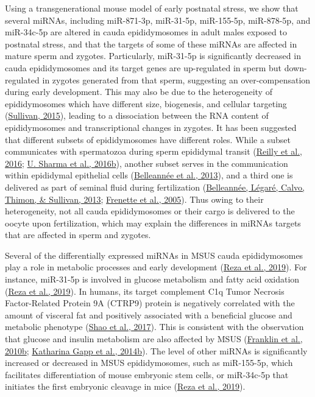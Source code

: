\documentclass[12pt,twoside]{reedthesis}
\begin{document}
Using a transgenerational mouse model of early postnatal stress, we show
that several miRNAs, including miR-871-3p, miR-31-5p, miR-155-5p,
miR-878-5p, and miR-34c-5p are altered in cauda epididymosomes in adult
males exposed to postnatal stress, and that the targets of some of these
miRNAs are affected in mature sperm and zygotes. Particularly, miR-31-5p
is significantly decreased in cauda epididymosomes and its target genes
are up-regulated in sperm but down-regulated in zygotes generated from
that sperm, suggesting an over-compensation during early development.
This may also be due to the heterogeneity of epididymosomes which have
different size, biogenesis, and cellular targeting (\protect\hyperlink{ref-sullivan_2015}{Sullivan, 2015}),
leading to a dissociation between the RNA content of epididymosomes and
transcriptional changes in zygotes. It has been suggested that different
subsets of epididymosomes have different roles. While a subset
communicates with spermatozoa during sperm epididymal transit
(\protect\hyperlink{ref-reilly_2016}{Reilly et al., 2016}; \protect\hyperlink{ref-sharma_2016}{U. Sharma et al., 2016b}), another subset serves in the communication
within epididymal epithelial cells (\protect\hyperlink{ref-belleanne_2013a}{Belleannée et al., 2013}), and a third one
is delivered as part of seminal fluid during fertilization
(\protect\hyperlink{ref-belleanne_2013}{Belleannée, Légaré, Calvo, Thimon, \& Sullivan, 2013}; \protect\hyperlink{ref-frenette_2005}{Frenette et al., 2005}). Thus owing to their heterogeneity,
not all cauda epididymosomes or their cargo is delivered to the oocyte
upon fertilization, which may explain the differences in miRNAs targets
that are affected in sperm and zygotes.

Several of the differentially expressed miRNAs in MSUS cauda
epididymosomes play a role in metabolic processes and early development
(\protect\hyperlink{ref-reza_2019}{Reza et al., 2019}). For instance, miR-31-5p is involved in glucose metabolism
and fatty acid oxidation (\protect\hyperlink{ref-reza_2019}{Reza et al., 2019}). In humans, its target complement
C1q Tumor Necrosis Factor-Related Protein 9A (CTRP9) protein is
negatively correlated with the amount of visceral fat and positively
associated with a beneficial glucose and metabolic phenotype
(\protect\hyperlink{ref-shao_2017}{Shao et al., 2017}). This is consistent with the observation that glucose and
insulin metabolism are also affected by MSUS (\protect\hyperlink{ref-franklin_2010}{Franklin et al., 2010b}; \protect\hyperlink{ref-gapp_2014}{Katharina Gapp et al., 2014b}). The level of other miRNAs is significantly increased or
decreased in MSUS epididymosomes, such as miR-155-5p, which facilitates
differentiation of mouse embryonic stem cells, or miR-34c-5p that
initiates the first embryonic cleavage in mice (\protect\hyperlink{ref-reza_2019}{Reza et al., 2019}).
\end{document}
